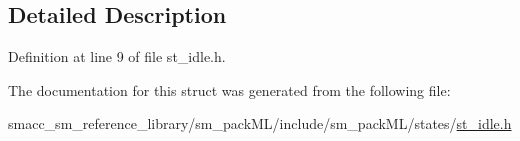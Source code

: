 \subsection{Detailed Description}


Definition at line 9 of file st\+\_\+idle.\+h.



The documentation for this struct was generated from the following file\+:\begin{DoxyCompactItemize}
\item 
smacc\+\_\+sm\+\_\+reference\+\_\+library/sm\+\_\+pack\+M\+L/include/sm\+\_\+pack\+M\+L/states/\hyperlink{st__idle_8h}{st\+\_\+idle.\+h}\end{DoxyCompactItemize}
